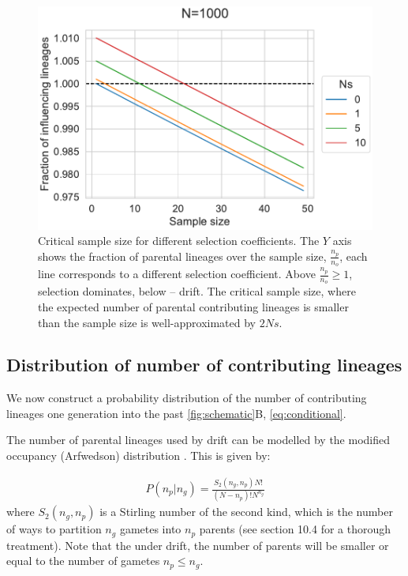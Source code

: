 \documentclass[review]{elsarticle}
\begin{document}
\begin{figure}
  \centering
  \includegraphics{fig/critical_sample_size.pdf}
  \caption{Critical sample size for different selection coefficients. The $Y$ axis shows the
    fraction of parental lineages over the sample size, $\frac{n_p}{n_o}$, each line corresponds to a
    different selection coefficient. Above $\frac{n_p}{n_o}\ge 1$, selection dominates, below -- drift.
    The critical sample size, where the expected number of parental contributing lineages is smaller
    than the sample size is well-approximated by $2Ns$.}
  \label{fig:critical-sample-size}
\end{figure}

\subsection{Distribution of number of contributing lineages}
\label{subsec:distribution}

We now construct a probability distribution of the number of contributing lineages one generation
into the past \ref{fig:schematic}B, \eqref{eq:conditional}. 

The number of parental lineages used by drift can be modelled by the modified occupancy
(Arfwedson) distribution \citep{Wakeley2009,ONeill2019,JohnsonEtAl2005}. This is given by:

\begin{align}
  \label{eq:occupancy}
  P(n_p|n_g) = \frac{S_2(n_g,n_p) N!}{(N-n_p)! N^{n_g}}
\end{align}
where $S_2(n_g,n_p)$ is a Stirling number of the second kind, which is the number of ways to partition
$n_g$ gametes into $n_p$ parents (see \cite{JohnsonEtAl2005} section 10.4 for a thorough treatment).
Note that the under drift, the number of parents will be smaller or equal to the number of gametes
$n_p \le n_g$.
\end{document}
